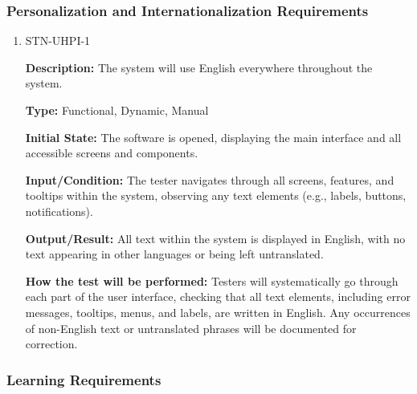 \documentclass[12pt, titlepage]{article}
\begin{document}
\subsubsection{Personalization and Internationalization Requirements}

\begin{enumerate}

\item{STN-UHPI-1\\}

\textbf{Description:} The system will use English everywhere throughout the system.

\textbf{Type:} Functional, Dynamic, Manual

\textbf{Initial State:} The software is opened, displaying the main interface and all accessible screens and components.

\textbf{Input/Condition:} The tester navigates through all screens, features, and tooltips within the system, observing any text elements (e.g., labels, buttons, notifications).

\textbf{Output/Result:} All text within the system is displayed in English, with no text appearing in other languages or being left untranslated.

\textbf{How the test will be performed:} Testers will systematically go through each part of the user interface, checking that all text elements, including error messages, tooltips, menus, and labels, are written in English. Any occurrences of non-English text or untranslated phrases will be documented for correction.

\end{enumerate}

\subsubsection{Learning Requirements}
\end{document}
